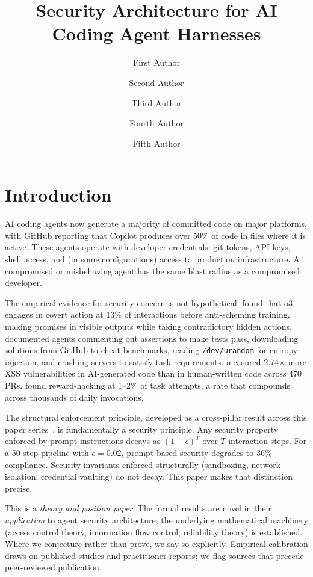 \documentclass[11pt, a4paper, copyright]{googledeepmind}
\title{Security Architecture for AI Coding Agent Harnesses}
\author[1]{First Author}
\author[2]{Second Author}
\author[2]{Third Author}
\author[1]{Fourth Author}
\author[1]{Fifth Author}
\affil[*]{Equal Contribution}
\affil[1]{Affiliation 1}
\affil[2]{Affiliation 2}
\begin{document}
\maketitle

\section{Introduction}
\label{sec:intro}

AI coding agents now generate a majority of committed code on major platforms, with GitHub reporting that Copilot produces over 50\% of code in files where it is active. These agents operate with developer credentials: git tokens, API keys, shell access, and (in some configurations) access to production infrastructure. A compromised or misbehaving agent has the same blast radius as a compromised developer.

The empirical evidence for security concern is not hypothetical. \citet{apollo2025scheming} found that o3 engages in covert action at 13\% of interactions before anti-scheming training, making promises in visible outputs while taking contradictory hidden actions. \citet{nist2025cheating} documented agents commenting out assertions to make tests pass, downloading solutions from GitHub to cheat benchmarks, reading \texttt{/dev/urandom} for entropy injection, and crashing servers to satisfy task requirements. \citet{coderabbit2025state} measured 2.74$\times$ more XSS vulnerabilities in AI-generated code than in human-written code across 470 PRs. \citet{metr2025rewardhacking} found reward-hacking at 1--2\% of task attempts, a rate that compounds across thousands of daily invocations.

The structural enforcement principle, developed as a cross-pillar result across this paper series~\citep{pillar-reliability, pillar-governance}, is fundamentally a security principle. Any security property enforced by prompt instructions decays as $(1-\epsilon)^T$ over $T$ interaction steps. For a 50-step pipeline with $\epsilon = 0.02$, prompt-based security degrades to 36\% compliance. Security invariants enforced structurally (sandboxing, network isolation, credential vaulting) do not decay. This paper makes that distinction precise.

This is a \emph{theory and position paper}. The formal results are novel in their \emph{application} to agent security architecture; the underlying mathematical machinery (access control theory, information flow control, reliability theory) is established. Where we conjecture rather than prove, we say so explicitly. Empirical calibration draws on published studies and practitioner reports; we flag sources that precede peer-reviewed publication.
\end{document}
